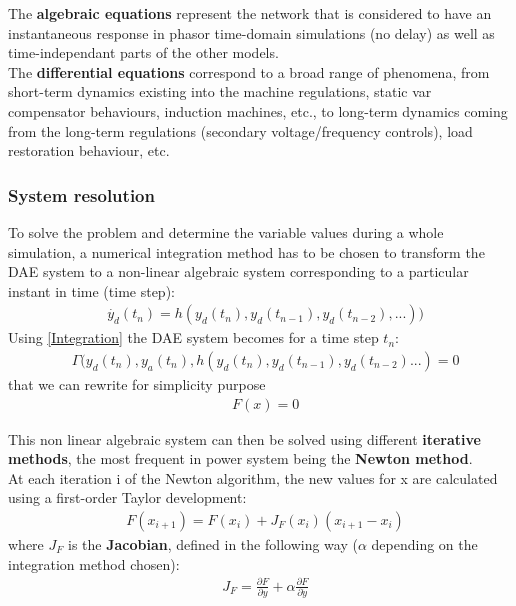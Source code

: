 \documentclass[a4paper, 12pt]{report}
\begin{document}
The \textbf{algebraic equations} represent the network that is considered to have an instantaneous response in phasor time-domain simulations (no delay) as well as time-independant parts of the other models.\\

The \textbf{differential equations} correspond to a broad range of phenomena, from short-term dynamics existing into the machine regulations, static var compensator behaviours, induction machines, etc., to long-term dynamics coming from the long-term regulations (secondary voltage/frequency controls), load restoration behaviour, etc.

\subsubsection{System resolution}
\label{Dynawo_Solver_System_Resolution}

To solve the problem and determine the variable values during a whole simulation, a numerical integration method has to be chosen to transform the \ac{DAE} system to a non-linear algebraic system corresponding to a particular instant in time (time step):
\begin{equation}
\begin{aligned}
& \dot{y_d}(t_n) = h(y_d(t_n), y_d(t_{n-1}), y_d(t_{n-2}), ...))
\end{aligned}
\label{Integration}
\end{equation}
Using \eqref{Integration} the \ac{DAE} system becomes for a time step $t_n$:
\begin{equation}
\begin{aligned}
& \Gamma(y_d(t_n), y_a(t_n), h(y_d(t_n), y_d(t_{n-1}), y_d(t_{n-2}) ...) = 0
\end{aligned}
\end{equation}
that we can rewrite for simplicity purpose
\begin{equation}
\begin{aligned}
& F(x) = 0
\end{aligned}
\label{Correction}
\end{equation}

This non linear algebraic system can then be solved using different \textbf{iterative methods}, the most frequent in power system being the \textbf{Newton method}. \\

At each iteration i of the Newton algorithm, the new values for x are calculated using a first-order Taylor development:
\begin{equation}
\begin{aligned}
& F(x_{i+1}) = F(x_i) + J_F(x_i)(x_{i+1} - x_i)
\end{aligned}
\label{Newton}
\end{equation}
where $J_F$ is the \textbf{Jacobian}, defined in the following way ($\alpha$ depending on the integration method chosen):
\begin{equation}
\begin{aligned}
& J_F = \frac{\partial F}{\partial y} + \alpha \frac{\partial F}{\partial \dot{y}}
\end{aligned}
\end{equation}
\end{document}
